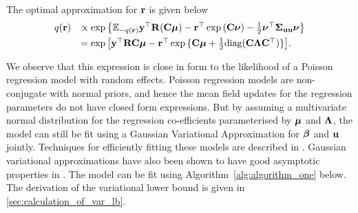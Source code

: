 
The optimal approximation for ${\bf r}$ is given below %
\begin{equation}
\label{eq:optimal_approximation}
\begin{array}{rl}
	q({\bf r}) & \propto \exp \left \{ {\mathbb E}_{-q({\bf r})}{\bf y}^\top{\bf R}({\bf C}{\boldsymbol \mu}) - {\bf r}^\top\exp{({\bf C}{\boldsymbol\nu})}-\frac{1}{2} {\boldsymbol \nu}^\top {\boldsymbol\Sigma}_{{\bf u} {\bf u}} {\boldsymbol \nu} \right \}                                                  \\ [1ex]
	       & = \exp{ \left[ {\bf y}^\top{\bf R}{\bf C}{\boldsymbol\mu}- {\bf r}^\top \exp{\{{\bf C}{\boldsymbol\mu}+ \frac{1}{2} \text{diag}({\bf C}{\boldsymbol\Lambda}{\bf C}^\top)\}} \right] }.
\end{array}
\end{equation}

We observe that this expression is close in form to the likelihood of a Poisson
regression model with random effects. Poisson regression models are
non-conjugate with normal priors, and hence the mean field updates for the
regression parameters do not have closed form expressions. But by assuming a
multivariate normal distribution for the regression co-efficients parameterised
by ${\boldsymbol \mu}$ and ${\boldsymbol \Lambda}$, the model can still be fit using a Gaussian
Variational Approximation for ${\boldsymbol \beta}$ and ${\bf u}$ jointly. Techniques for
efficiently fitting these models are described in \cite{Ormerod2012,
Challis2013, Opper2009}. Gaussian variational approximations have also been
shown to have good asymptotic properties in \cite{Sinica2017}. The model can be
fit using Algorithm~\ref{alg:algorithm_one} below. The derivation of the
variational lower bound is given in \ref{sec:calculation_of_var_lb}.

